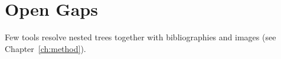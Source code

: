 \section{Open Gaps}
Few tools resolve nested \verb|| trees together with bibliographies and images (see
Chapter~\ref{ch:method}).
